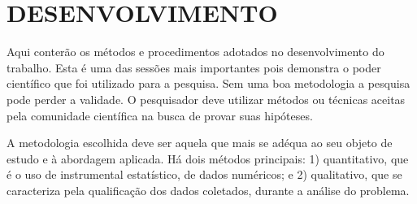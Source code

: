 \section{DESENVOLVIMENTO}
Aqui conterão os métodos e procedimentos adotados no desenvolvimento do trabalho. Esta é uma das sessões mais importantes pois demonstra o poder científico que foi utilizado para a pesquisa. Sem uma boa metodologia a pesquisa pode perder a validade. O pesquisador deve utilizar métodos ou técnicas aceitas pela comunidade científica na busca de provar suas hipóteses.

A metodologia escolhida deve ser aquela que mais se adéqua ao seu objeto de estudo e à abordagem aplicada. Há dois métodos principais: 1) quantitativo, que é o uso de instrumental estatístico, de dados numéricos; e 2) qualitativo, que se caracteriza pela qualificação dos dados coletados, durante a análise do problema.